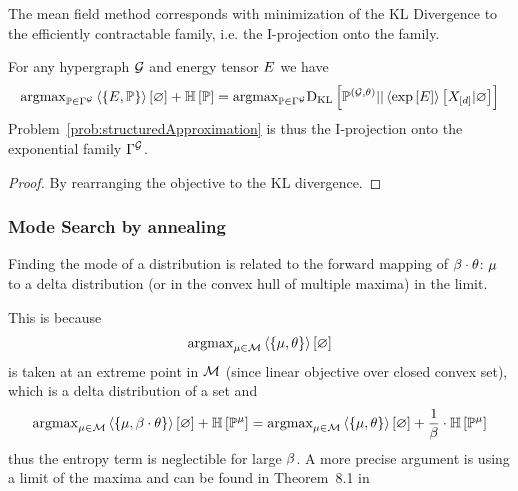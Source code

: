 The mean field method corresponds with minimization of the KL Divergence to the efficiently contractable family, i.e. the I-projection onto the family.

\begin{theorem}
	For any hypergraph $\mathcal{G}$ and energy tensor $E$ we have 
	\begin{align*}
		\mathrm{argmax}_{\mathbb{P}\in \Gamma^{\mathcal{G}}} \left\langle \left\{E, \mathbb{P}\right\}\right\rangle \left[ \varnothing \right]+ \mathbb{H}\left[\mathbb{P}\right]
		= \mathrm{argmax}_{\mathbb{P}\in \Gamma^{\mathcal{G}}} \mathrm{D}_{\mathrm{KL}}\left[ \mathbb{P}^{(\mathcal{G},\theta)} || \left\langle \mathrm{exp}\left[E\right]\right\rangle \left[ X_{[d]} | \varnothing \right] \right]
	\end{align*}
	Problem~\ref{prob:structuredApproximation} is thus the I-projection onto the exponential family $\Gamma^{\mathcal{G}}$.
\end{theorem}
\begin{proof}
	By rearranging the objective to the KL divergence.
\end{proof}


\subsubsection{Mode Search by annealing}

Finding the mode of a distribution is related to the forward mapping of $\beta\cdot\theta$: $\mu$ to a delta distribution (or in the convex hull of multiple maxima) in the limit.

This is because 
\begin{align*}
	\mathrm{argmax}_{\mu\in\mathcal{M}}  \left\langle \left\{\mu,\theta\right\}\right\rangle \left[ \varnothing \right]
\end{align*}
is taken at an extreme point in $\mathcal{M}$ (since linear objective over closed convex set), which is a delta distribution of a set and
\begin{align*}
	\mathrm{argmax}_{\mu\in\mathcal{M}}  \left\langle \left\{\mu,\beta\cdot\theta\right\}\right\rangle \left[ \varnothing \right]+ \mathbb{H}\left[\mathbb{P}^{\mu}\right] 
	= 
	\mathrm{argmax}_{\mu\in\mathcal{M}}  \left\langle \left\{\mu,\theta\right\}\right\rangle \left[ \varnothing \right] + \frac{1}{\beta} \cdot \mathbb{H}\left[\mathbb{P}^{\mu}\right] 	
\end{align*}
thus the entropy term is neglectible for large $\beta$.
A more precise argument is using a limit of the maxima and can be found in Theorem~8.1 in \cite{wainwright_graphical_2008}





